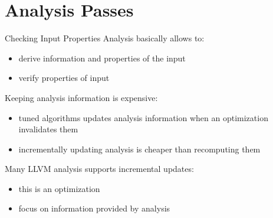 
\section{Analysis Passes}
\begin{frame}{Checking Input Properties}
Analysis basically allows to:
\begin{itemize}
\item \alert{derive} information and properties of the input
\item \alert{verify} properties of input
\end{itemize}

\vfill
Keeping analysis information is expensive:
\begin{itemize}
\item tuned algorithms updates analysis information when an optimization
      invalidates them
\item incrementally updating analysis is cheaper than recomputing them
\end{itemize}

\vfill
Many LLVM analysis supports incremental updates:
\begin{itemize}
\item this is an \alert{optimization}
\item focus on \alert{information} provided by analysis
\end{itemize}
\end{frame}

